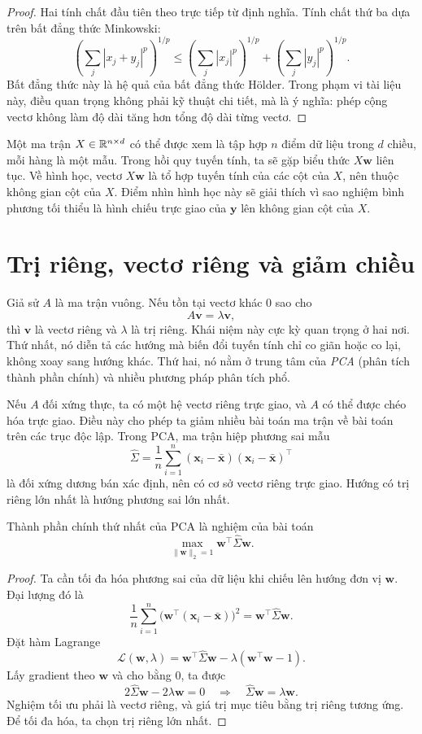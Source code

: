 \begin{proof}
Hai tính chất đầu tiên theo trực tiếp từ định nghĩa. Tính chất thứ ba dựa trên bất đẳng thức Minkowski:
\[
\left(\sum_j |x_j+y_j|^p\right)^{1/p}
\le
\left(\sum_j |x_j|^p\right)^{1/p}
+
\left(\sum_j |y_j|^p\right)^{1/p}.
\]
Bất đẳng thức này là hệ quả của bất đẳng thức Hölder. Trong phạm vi tài liệu này, điều quan trọng không phải kỹ thuật chi tiết, mà là ý nghĩa: phép cộng vectơ không làm độ dài tăng hơn tổng độ dài từng vectơ.
\end{proof}

Một ma trận $X \in \mathbb{R}^{n\times d}$ có thể được xem là tập hợp $n$ điểm dữ liệu trong $d$ chiều, mỗi hàng là một mẫu. Trong hồi quy tuyến tính, ta sẽ gặp biểu thức $X\bm{w}$ liên tục. Về hình học, vectơ $X\bm{w}$ là tổ hợp tuyến tính của các cột của $X$, nên thuộc không gian cột của $X$. Điểm nhìn hình học này sẽ giải thích vì sao nghiệm bình phương tối thiểu là hình chiếu trực giao của $\bm{y}$ lên không gian cột của $X$.

\section{Trị riêng, vectơ riêng và giảm chiều}

Giả sử $A$ là ma trận vuông. Nếu tồn tại vectơ khác 0 sao cho
\[
A\bm{v} = \lambda \bm{v},
\]
thì $\bm{v}$ là vectơ riêng và $\lambda$ là trị riêng. Khái niệm này cực kỳ quan trọng ở hai nơi. Thứ nhất, nó diễn tả các hướng mà biến đổi tuyến tính chỉ co giãn hoặc co lại, không xoay sang hướng khác. Thứ hai, nó nằm ở trung tâm của \emph{PCA} (phân tích thành phần chính) và nhiều phương pháp phân tích phổ.

Nếu $A$ đối xứng thực, ta có một hệ vectơ riêng trực giao, và $A$ có thể được chéo hóa trực giao. Điều này cho phép ta giảm nhiều bài toán ma trận về bài toán trên các trục độc lập. Trong PCA, ma trận hiệp phương sai mẫu
\[
\widehat{\Sigma} = \frac{1}{n}\sum_{i=1}^n (\bm{x}_i-\bar{\bm{x}})(\bm{x}_i-\bar{\bm{x}})^\top
\]
là đối xứng dương bán xác định, nên có cơ sở vectơ riêng trực giao. Hướng có trị riêng lớn nhất là hướng phương sai lớn nhất.

\begin{theorem}
Thành phần chính thứ nhất của PCA là nghiệm của bài toán
\[
\max_{\|\bm{w}\|_2=1} \bm{w}^\top \widehat{\Sigma}\bm{w}.
\]
\end{theorem}

\begin{proof}
Ta cần tối đa hóa phương sai của dữ liệu khi chiếu lên hướng đơn vị $\bm{w}$. Đại lượng đó là
\[
\frac{1}{n}\sum_{i=1}^n \big(\bm{w}^\top(\bm{x}_i-\bar{\bm{x}})\big)^2
= \bm{w}^\top \widehat{\Sigma}\bm{w}.
\]
Đặt hàm Lagrange
\[
\mathcal{L}(\bm{w},\lambda)=\bm{w}^\top \widehat{\Sigma}\bm{w}-\lambda(\bm{w}^\top \bm{w}-1).
\]
Lấy gradient theo $\bm{w}$ và cho bằng 0, ta được
\[
2\widehat{\Sigma}\bm{w} - 2\lambda \bm{w}=0
\quad\Longrightarrow\quad
\widehat{\Sigma}\bm{w}=\lambda \bm{w}.
\]
Nghiệm tối ưu phải là vectơ riêng, và giá trị mục tiêu bằng trị riêng tương ứng. Để tối đa hóa, ta chọn trị riêng lớn nhất.
\end{proof}

